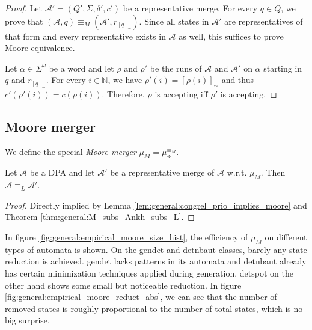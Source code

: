 \begin{proof} 
	Let $\mathcal{A}' = (Q', \Sigma, \delta', c')$ be a representative merge. For every $q \in Q$, we prove that $(\mathcal{A}, q) \equiv_M (\mathcal{A}', r_{[q]_\sim})$. Since all states in $\mathcal{A}'$ are representatives of that form and every representative exists in $\mathcal{A}$ as well, this suffices to prove Moore equivalence.
	
	Let $\alpha \in \Sigma^\omega$ be a word and let $\rho$ and $\rho'$ be the runs of $\mathcal{A}$ and $\mathcal{A}'$ on $\alpha$ starting in $q$ and $r_{[q]_\sim}$. For every $i \in \mathbb{N}$, we have $\rho'(i) = [\rho(i)]_\sim$ and thus $c'(\rho'(i)) = c(\rho(i))$. Therefore, $\rho$ is accepting iff $\rho'$ is accepting.
\end{proof}



\subsection{Moore merger}
\begin{defn}
	We define the special \emph{Moore merger} $\mu_M = \mu_\div^{\equiv_M}$.
\end{defn}

\begin{lem}
	Let $\mathcal{A}$ be a DPA and let $\mathcal{A}'$ be a representative merge of $\mathcal{A}$ w.r.t. $\mu_M$. Then $\mathcal{A} \equiv_L \mathcal{A}'$.
\end{lem}

\begin{proof}
	Directly implied by Lemma \ref{lem:general:congrel_prio_implies_moore} and Theorem \ref{thm:general:M_subs_Ankh_subs_L}.
\end{proof}

\vspace{5pt}

In figure \ref{fig:general:empirical_moore_size_hist}, the efficiency of $\mu_M$ on different types of automata is shown. On the \textsf{gendet} and \textsf{detnbaut} classes, barely any state reduction is achieved. \textsf{gendet} lacks patterns in its automata and \textsf{detnbaut} already has certain minimization techniques applied during generation. \textsf{detspot} on the other hand shows some small but noticeable reduction. In figure \ref{fig:general:empirical_moore_reduct_abs}, we can see that the number of removed states is roughly proportional to the number of total states, which is no big surprise.

